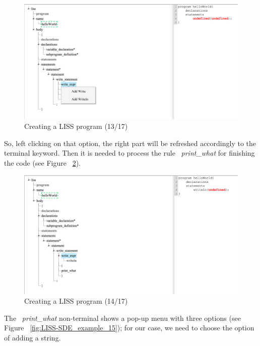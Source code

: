 \documentclass[
  oneside,
  11pt, a4paper,
  footinclude=true,
  headinclude=true,
  cleardoublepage=empty
]{scrbook}
\begin{document}
\begin{figure}[h!]
  \centering
    \includegraphics[width=1\textwidth]{img/LISS-SDE_creating_program/LISS-SDE13.png}
    \caption{Creating a LISS program (13/17)}
    \label{fig:LISS-SDE_example_13}
\end{figure}

So, left clicking on that option, the right part will be refreshed accordingly to the terminal keyword. Then it is needed to process the rule ~\textit{print\_what} for finishing the code (see Figure ~\ref{fig:LISS-SDE_example_14}).

\begin{figure}[h!]
  \centering
    \includegraphics[width=1\textwidth]{img/LISS-SDE_creating_program/LISS-SDE14.png}
    \caption{Creating a LISS program (14/17)}
    \label{fig:LISS-SDE_example_14}
\end{figure}

The ~\textit{print\_what} non-terminal shows a pop-up menu with three options (see Figure ~\ref{fig:LISS-SDE_example_15}); for our case, we need to choose the option of adding a string.
\end{document}
